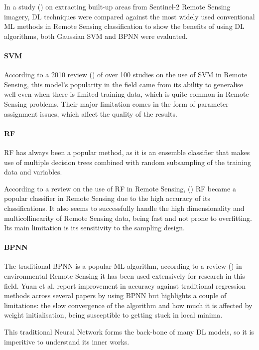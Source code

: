 In a study (\cite{isprs-archives-XLII-3-79-2018}) on extracting built-up areas from Sentinel-2 Remote Sensing imagery, \gls{DL} techniques were compared against the most widely used conventional \gls{ML} methods in Remote Sensing classification to show the benefits of using \gls{DL} algorithms, both Gaussian \gls{SVM} and \gls{BPNN} were evaluated.

\paragraph{\gls{SVM}}
According to a 2010 review (\cite{MOUNTRAKIS2011247}) of over 100 studies on the use of \gls{SVM} in Remote Sensing, this model's popularity in the field came from its ability to generalise well even when there is limited training data, which is quite common in Remote Sensing problems. Their major limitation comes in the form of parameter assignment issues, which affect the quality of the results.

\paragraph{\gls{RF}}
\gls{RF} has always been a popular method, as it is an ensemble classifier that makes use of multiple decision trees combined with random subsampling of the training data and variables. 

According to a review on the use of \gls{RF} in Remote Sensing, (\cite{BELGIU201624}) \gls{RF} became a popular classifier in Remote Sensing due to the high accuracy of its classifications. It also seems to successfully handle the high dimensionality and multicollinearity of Remote Sensing data, being fast and not prone to overfitting. Its main limitation is its sensitivity to the sampling design.

\paragraph{\gls{BPNN}}
The traditional \gls{BPNN} is a popular \gls{ML} algorithm, according to a review (\cite{YUAN2020111716}) in environmental Remote Sensing it has been used extensively for research in this field. Yuan et al. report improvement in accuracy against traditional regression methods across several papers by using \gls{BPNN} but highlights a couple of limitations: the slow convergence of the algorithm and how much it is affected by weight initialisation, being susceptible to getting stuck in local minima. 

This traditional Neural Network forms the back-bone of many \gls{DL} models, so it is imperitive to understand its inner works.

